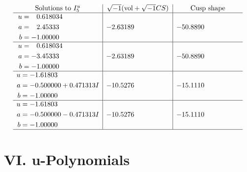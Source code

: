 \documentclass[1p]{elsarticle_modified}
\theoremstyle{definition}
\newcommand{\I}{\sqrt{-1}}
\begin{document}
$$\begin{array}{c|c|c}  
\text{Solutions to }I^u_{5}& \I (\text{vol} + \sqrt{-1}CS) & \text{Cusp shape}\\
 \hline 
\begin{aligned}
u &= \phantom{-}0.618034\phantom{ +0.000000I} \\
a &= \phantom{-}2.45333\phantom{ +0.000000I} \\
b &= -1.00000\phantom{ +0.000000I}\end{aligned}
 & -2.63189\phantom{ +0.000000I} & -50.8890\phantom{ +0.000000I} \\ \hline\begin{aligned}
u &= \phantom{-}0.618034\phantom{ +0.000000I} \\
a &= -3.45333\phantom{ +0.000000I} \\
b &= -1.00000\phantom{ +0.000000I}\end{aligned}
 & -2.63189\phantom{ +0.000000I} & -50.8890\phantom{ +0.000000I} \\ \hline\begin{aligned}
u &= -1.61803\phantom{ +0.000000I} \\
a &= -0.500000 + 0.471313 I \\
b &= -1.00000\phantom{ +0.000000I}\end{aligned}
 & -10.5276\phantom{ +0.000000I} & -15.1110\phantom{ +0.000000I} \\ \hline\begin{aligned}
u &= -1.61803\phantom{ +0.000000I} \\
a &= -0.500000 - 0.471313 I \\
b &= -1.00000\phantom{ +0.000000I}\end{aligned}
 & -10.5276\phantom{ +0.000000I} & -15.1110\phantom{ +0.000000I}\\
 \hline 
 \end{array}$$\newpage
\newpage\renewcommand{\arraystretch}{1}
\centering \section*{ VI. u-Polynomials}
\end{document}
